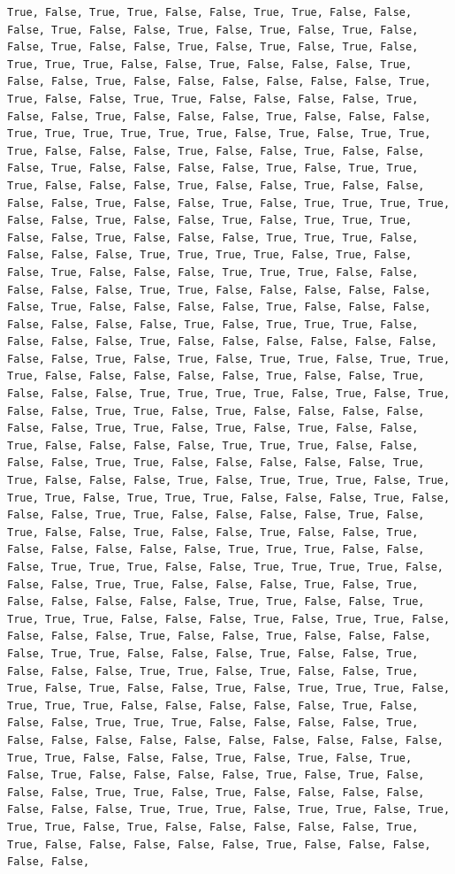 \documentclass[
  letterpaper,
  DIV=11,
  numbers=noendperiod]{scrartcl}
\begin{document}
\begin{verbatim}
True, False, True, True, False, False, True, True, False, False, False, True, False, False, True, False, True, False, True, False, False, True, False, False, True, False, True, False, True, False, True, True, True, False, False, True, False, False, False, True, False, False, True, False, False, False, False, False, False, True, True, False, False, True, True, False, False, False, False, True, False, False, True, False, False, False, True, False, False, False, True, True, True, True, True, True, False, True, False, True, True, True, False, False, False, True, False, False, True, False, False, False, True, False, False, False, False, True, False, True, True, True, False, False, False, True, False, False, True, False, False, False, False, True, False, False, True, False, True, True, True, True, False, False, True, False, False, True, False, True, True, True, False, False, True, False, False, False, True, True, True, False, False, False, False, True, True, True, True, False, True, False, False, True, False, False, False, True, True, True, False, False, False, False, False, True, True, False, False, False, False, False, False, True, False, False, False, False, True, False, False, False, False, False, False, False, True, False, True, True, True, False, False, False, False, True, False, False, False, False, False, False, False, False, True, False, True, False, True, True, False, True, True, True, False, False, False, False, False, True, False, False, True, False, False, False, True, True, True, True, False, True, False, True, False, False, True, True, False, True, False, False, False, False, False, False, True, True, False, True, False, True, False, False, True, False, False, False, False, True, True, True, False, False, False, False, True, True, False, False, False, False, False, True, True, False, False, False, True, False, True, True, True, False, True, True, True, False, True, True, True, False, False, False, True, False, False, False, True, True, False, False, False, False, True, False, True, False, False, True, False, False, True, False, False, True, False, False, False, False, False, True, True, True, False, False, False, True, True, True, False, False, True, True, True, True, False, False, False, True, True, False, False, False, True, False, True, False, False, False, False, False, True, True, False, False, True, True, True, True, False, False, False, True, False, True, True, False, False, False, False, True, False, False, True, False, False, False, False, True, True, False, False, False, True, False, False, True, False, False, False, True, True, False, True, False, False, True, True, False, True, False, False, True, False, True, True, True, False, True, True, True, False, False, False, False, False, True, False, False, False, True, True, True, False, False, False, False, True, False, False, False, False, False, False, False, False, False, False, True, True, False, False, False, True, False, True, False, True, False, True, False, False, False, False, True, False, True, False, False, False, True, True, False, True, False, False, False, False, False, False, False, True, True, True, False, True, True, False, True, True, True, False, True, False, False, False, False, False, True, True, False, False, False, False, False, True, False, False, False, False, False, 
\end{verbatim}
\end{document}
